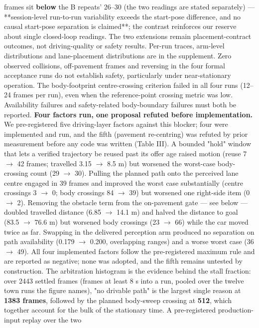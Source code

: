 \documentclass[journal]{IEEEtran}
\begin{document}
frames sit \textbf{below} the B repeats' 26--30 (the two readings are stated separately) ---
**session-level run-to-run variability exceeds the start-pose difference, and no causal start-pose separation is
claimed**; the contrast reinforces our reserve about single closed-loop readings. The two extensions remain
placement-contract outcomes, not driving-quality or safety results.
Per-run traces, arm-level distributions and lane-placement distributions are in the supplement.
Zero observed collisions, off-pavement frames and reversing in the four formal acceptance runs do not
establish safety, particularly under near-stationary operation. The body-footprint centre-crossing
criterion failed in all four runs (12--24 frames per run), even when the reference-point crossing metric
was low. Availability failures and safety-related body-boundary failures must both be reported.
\textbf{Four factors run, one proposal refuted before implementation.} We pre-registered five driving-layer
factors against this blocker; four were implemented and run, and the fifth (pavement re-centring) was
refuted by prior measurement before any code was written (Table III). A bounded "hold" window that lets a verified trajectory be reused past its
offer age raised motion (reuse 7 $\rightarrow$ 42 frames; travelled 3.15 $\rightarrow$ 8.5 m) but worsened the worst-case
body-crossing count (29 $\rightarrow$ 30). Pulling the planned path onto the perceived lane centre engaged in 39
frames and improved the worst case substantially (centre crossings 3 $\rightarrow$ 0; body crossings 84 $\rightarrow$ 39)
but worsened one right-side item (0 $\rightarrow$ 2). Removing the obstacle term from the on-pavement gate --- see
below --- doubled travelled distance (6.85 $\rightarrow$ 14.1 m) and halved the distance to goal (83.5 $\rightarrow$ 76.6 m)
but worsened body crossings (23 $\rightarrow$ 66) while the car moved twice as far. Swapping in the delivered
perception arm produced no separation on path availability (0.179 $\rightarrow$ 0.200, overlapping ranges) and a
worse worst case (36 $\rightarrow$ 49). All four implemented factors follow the pre-registered maximum rule and are reported as negative; none was
adopted, and the fifth remains untested by construction.
The arbitration histogram is the evidence behind the stall fraction: over 2443 settled frames (frames at
least 8 s into a run, pooled over the twelve town runs the figure names), "no drivable path" is the largest
single reason at \textbf{1383 frames}, followed by the planned body-sweep crossing at \textbf{512}, which together
account for the bulk of the stationary time. A pre-registered production-input replay over the two
\end{document}
